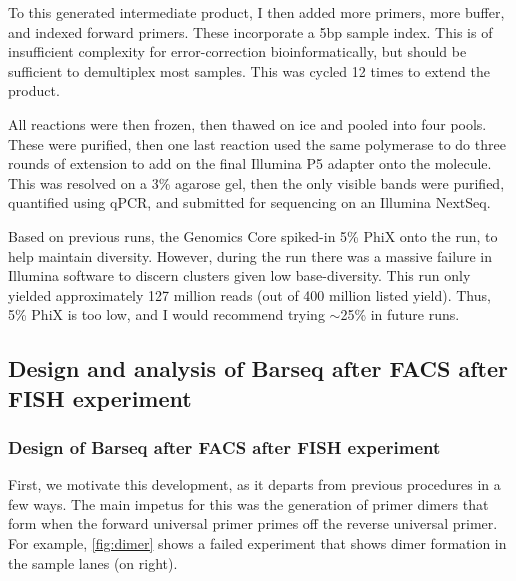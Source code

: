 To this generated intermediate product, I then added more primers,
more buffer, and indexed forward primers. These incorporate a 5bp
sample index. This is of insufficient complexity for error-correction
bioinformatically, but should be sufficient to demultiplex most
samples. This was cycled 12 times to extend the product.

All reactions were then frozen, then thawed on ice and pooled into
four pools. These were purified, then one last reaction used the
same polymerase to do three rounds of extension to add on the final
Illumina P5 adapter onto the molecule. This was resolved on a 3\%
agarose gel, then the only visible bands were purified, quantified
using qPCR, and submitted for sequencing on an Illumina NextSeq.

Based on previous runs, the Genomics Core spiked-in 5\% PhiX onto
the run, to help maintain diversity. However, during the run there was
a massive failure in Illumina software to discern clusters given
low base-diversity.  This run only yielded approximately 127 million
reads (out of 400 million listed yield). Thus, 5\% PhiX is too low,
and I would recommend trying $\sim$25\% in future runs. 

\subsection{Design and analysis of Barseq after FACS after FISH experiment}

\subsubsection{Design of Barseq after FACS after FISH experiment}

\label{subsection:bff}

First, we motivate this development, as it departs from previous procedures
in a few ways.  
The main impetus for this was the generation of primer dimers that form
when the forward universal primer primes off the reverse universal
primer. For example, \autoref{fig:dimer} shows a failed experiment
that shows dimer formation in the sample lanes (on right). 

\vspace{3em}

